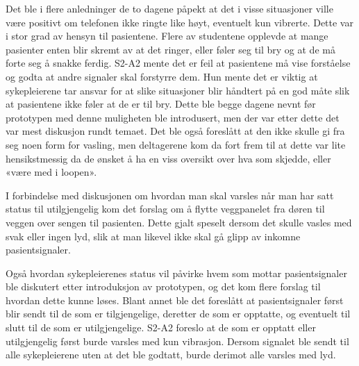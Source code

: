 \noindent
Det ble i flere anledninger de to dagene påpekt at det i visse situasjoner ville være positivt om telefonen ikke ringte like høyt, eventuelt kun vibrerte.
Dette var i stor grad av hensyn til pasientene. Flere av studentene opplevde at mange pasienter enten blir skremt av at det ringer, eller føler seg til bry og at de må forte seg å snakke ferdig. 
S2-A2 mente det er feil at pasientene må vise forståelse og godta at andre signaler skal forstyrre dem. Hun mente det er viktig at sykepleierene tar ansvar for at slike situasjoner blir håndtert på en god måte slik at pasientene ikke føler at de er til bry.
Dette ble begge dagene nevnt før prototypen med denne muligheten ble introdusert, men der var etter dette det var mest diskusjon rundt temaet. 
Det ble også foreslått at den ikke skulle gi fra seg noen form for vasling, men deltagerene kom da fort frem til at dette var lite hensikstmessig da de ønsket å ha en viss oversikt over hva som skjedde, eller «være med i loopen».

\noindent
I forbindelse med diskusjonen om hvordan man skal varsles når man har satt status til utilgjengelig kom det forslag om å flytte veggpanelet fra døren til veggen over sengen til pasienten. Dette gjalt speselt dersom det skulle vasles med svak eller ingen lyd, slik at man likevel ikke skal gå glipp av inkomne pasientsignaler.

\noindent
Også hvordan sykepleierenes status vil påvirke hvem som mottar pasientsignaler ble diskutert etter introduksjon av prototypen, og det kom flere forslag til hvordan dette kunne løses. Blant annet ble det foreslått at pasientsignaler først blir sendt til de som er tilgjengelige, deretter de som er opptatte, og eventuelt til slutt til de som er utilgjengelige. S2-A2 foreslo at de som er opptatt eller utilgjengelig først burde varsles med kun vibrasjon. Dersom signalet ble sendt til alle sykepleierene uten at det ble godtatt, burde derimot alle varsles med lyd.